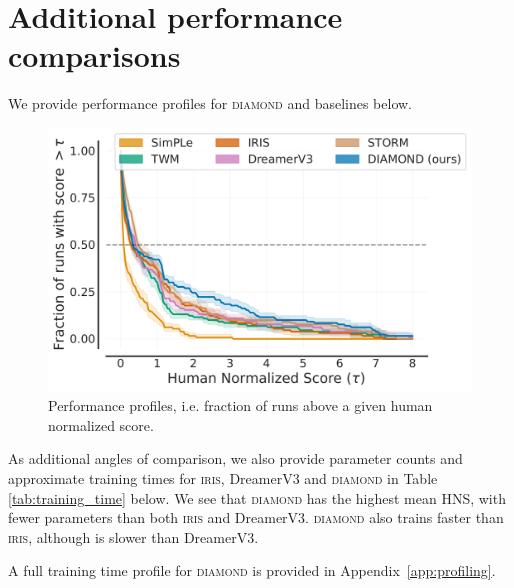 \section{Additional performance comparisons}
\label{app:performance_profile}

We provide performance profiles \citep{agarwal2021deep} for \textsc{diamond} and baselines below. %

\begin{figure}[h!]
\vskip 0.2in
\begin{center}
\centerline{\includegraphics[width=.7\columnwidth]{images/performance_profile.pdf}}
\caption{Performance profiles, i.e. fraction of runs above a given human normalized score.}
\label{fig:results_performance_profile}
\end{center}
\vskip 0.2in
\end{figure}

As additional angles of comparison, we also provide parameter counts and approximate training times for \textsc{iris}, DreamerV3 and \textsc{diamond} in Table \ref{tab:training_time} below. We see that \textsc{diamond} has the highest mean HNS, with fewer parameters than both \textsc{iris} and DreamerV3. \textsc{diamond} also trains faster than \textsc{iris}, although is slower than DreamerV3. 



A full training time profile for \textsc{diamond} is provided in Appendix~\ref{app:profiling}.